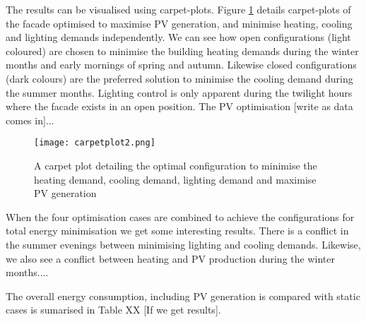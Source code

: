 


The results can be visualised using carpet-plots. Figure \ref{fig:carpetplot} details carpet-plots of the facade optimised to maximise PV generation, and minimise heating, cooling and lighting demands independently. We can see how open configurations (light coloured) are chosen to minimise the building heating demands during the winter months and early mornings of spring and autumn. Likewise closed configurations (dark colours) are the preferred solution to minimise the cooling demand during the summer months. Lighting control is only apparent during the twilight hours where the facade exists in an open position. The PV optimisation [write as data comes in]...

\begin{figure}
\begin{center}
\texttt{[image: carpetplot2.png]}
\caption{A carpet plot detailing the optimal configuration to minimise the heating demand, cooling demand, lighting demand and maximise PV generation}
\label{fig:carpetplot}
\end{center}
\end{figure}

When the four optimisation cases are combined to achieve the configurations for total energy minimisation we get some interesting results. There is a conflict in the summer evenings between minimising lighting and cooling demands. Likewise, we also see a conflict between heating and PV production during the winter months....

The overall energy consumption, including PV generation is compared with static cases is sumarised in Table XX [If we get results]. 
